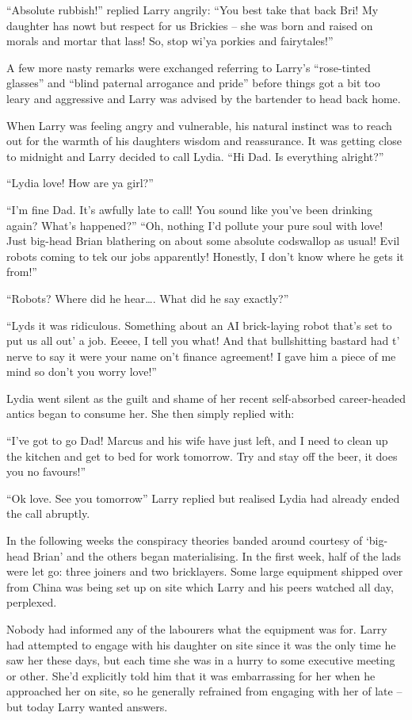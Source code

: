“Absolute rubbish!” replied Larry angrily: “You best take that back
Bri! My daughter has nowt but respect for us Brickies – she was born
and raised on morals and mortar that lass! So, stop wi’ya porkies and
fairytales!”

A few more nasty remarks were exchanged referring to Larry’s
“rose-tinted glasses” and “blind paternal arrogance and pride” before
things got a bit too leary and aggressive and Larry was advised by the
bartender to head back home.

When Larry was feeling angry and vulnerable, his natural instinct was
to reach out for the warmth of his daughters wisdom and
reassurance. It was getting close to midnight and Larry decided to
call Lydia. “Hi Dad. Is everything alright?”

“Lydia love! How are ya girl?”

“I’m fine Dad. It’s awfully late to call! You sound like you’ve been
drinking again? What’s happened?” “Oh, nothing I’d pollute your pure
soul with love! Just big-head Brian blathering on about some absolute
codswallop as usual! Evil robots coming to tek our jobs apparently!
Honestly, I don’t know where he gets it from!”

“Robots? Where did he hear…. What did he say exactly?”

“Lyds it was ridiculous. Something about an AI brick-laying robot
that’s set to put us all out’ a job. Eeeee, I tell you what! And that
bullshitting bastard had t’ nerve to say it were your name on’t
finance agreement! I gave him a piece of me mind so don’t you worry
love!”

Lydia went silent as the guilt and shame of her recent self-absorbed
career-headed antics began to consume her.  She then simply replied
with:

“I’ve got to go Dad! Marcus and his wife have just left, and I need to
clean up the kitchen and get to bed for work tomorrow. Try and stay
off the beer, it does you no favours!”

“Ok love. See you tomorrow” Larry replied but realised Lydia had
already ended the call abruptly.

In the following weeks the conspiracy theories banded around courtesy
of ‘big-head Brian’ and the others began materialising. In the first
week, half of the lads were let go: three joiners and two
bricklayers. Some large equipment shipped over from China was being
set up on site which Larry and his peers watched all day, perplexed.

Nobody had informed any of the labourers what the equipment was
for. Larry had attempted to engage with his daughter on site since it
was the only time he saw her these days, but each time she was in a
hurry to some executive meeting or other. She’d explicitly told him
that it was embarrassing for her when he approached her on site, so he
generally refrained from engaging with her of late – but today Larry
wanted answers.

